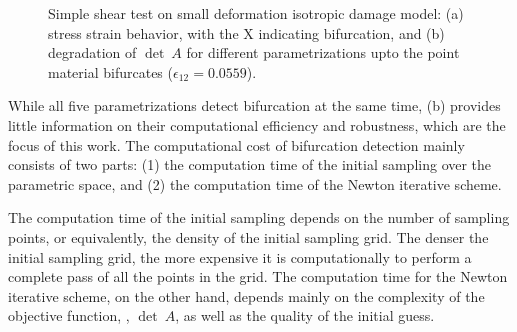 \documentclass[12pt]{article}
\numberwithin{equation}{section}
\begin{document}
\begin{figure}[!htbp]
  \centering {} 
  \caption{Simple shear test on small deformation isotropic damage
    model: (a) stress strain behavior, with the X indicating
    bifurcation, and (b) degradation of $\det~A$ for different
    parametrizations upto the point material bifurcates
    ($\epsilon_{12}=0.0559$).}
  \label{fig:iso-stress_strain}
\end{figure}

While all five parametrizations detect bifurcation at the same time,
(b) provides little information on their
computational efficiency and robustness, which are the focus of this
work. The computational cost of bifurcation detection mainly consists
of two parts: (1) the computation time of the initial sampling over
the parametric space, and (2) the computation time of the Newton
iterative scheme.

The computation time of the initial sampling depends on the number of
sampling points, or equivalently, the density of the initial sampling
grid. The denser the initial sampling grid, the more expensive it is
computationally to perform a complete pass of all the points in the
grid. The computation time for the Newton iterative scheme, on the
other hand, depends mainly on the complexity of the objective
function, \ie, $\det~A$, as well as the quality of the initial guess.
\end{document}
